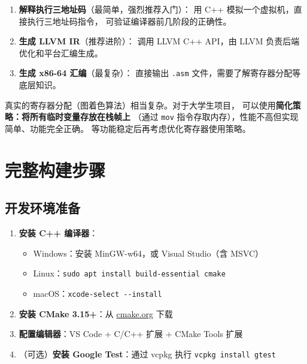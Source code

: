 \documentclass[12pt, a4paper]{ctexart}
\begin{document}
\begin{enumerate}
  \item \textbf{解释执行三地址码}（最简单，强烈推荐入门）：
        用 C++ 模拟一个虚拟机，直接执行三地址码指令，
        可验证编译器前几阶段的正确性。
  \item \textbf{生成 LLVM IR}（推荐进阶）：
        调用 LLVM C++ API，由 LLVM 负责后端优化和平台汇编生成。
  \item \textbf{生成 x86-64 汇编}（最复杂）：
        直接输出 \texttt{.asm} 文件，需要了解寄存器分配等底层知识。
\end{enumerate}

\begin{warnbox}[关于寄存器分配]
真实的寄存器分配（图着色算法）相当复杂。对于大学生项目，
可以使用\textbf{简化策略：将所有临时变量存放在栈帧上}
（通过 \texttt{mov} 指令存取内存），性能不高但实现简单、功能完全正确。
等功能稳定后再考虑优化寄存器使用策略。
\end{warnbox}

\section{完整构建步骤}

\subsection{开发环境准备}

\begin{enumerate}
  \item \textbf{安装 C++ 编译器}：
    \begin{itemize}[noitemsep]
      \item Windows：安装 MinGW-w64，或 Visual Studio（含 MSVC）
      \item Linux：\texttt{sudo apt install build-essential cmake}
      \item macOS：\texttt{xcode-select -{}-install}
    \end{itemize}
  \item \textbf{安装 CMake 3.15+}：从 \href{https://cmake.org/download/}{cmake.org} 下载
  \item \textbf{配置编辑器}：VS Code + C/C++ 扩展 + CMake Tools 扩展
  \item （可选）\textbf{安装 Google Test}：通过 vcpkg 执行
        \texttt{vcpkg install gtest}
\end{enumerate}
\end{document}
